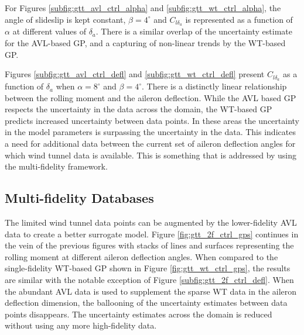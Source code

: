 For Figures \ref{subfig:gtt_avl_ctrl_alpha} and \ref{subfig:gtt_wt_ctrl_alpha}, the angle of slideslip is kept constant, $\beta=4^\circ$ and $C_{l{\delta_a}}$ is represented as a function of $\alpha$ at different values of $\delta_a$.
There is a similar overlap of the uncertainty estimate for the AVL-based GP, and a capturing of non-linear trends by the WT-based GP. 

Figures \ref{subfig:gtt_avl_ctrl_defl} and \ref{subfig:gtt_wt_ctrl_defl} present $C_{l{\delta_a}}$ as a function of $\delta_a$ when $\alpha = 8^\circ$ and $\beta = 4^\circ$.
There is a distinctly linear relationship between the rolling moment and the aileron deflection. 
While the AVL based GP respects the uncertainty in the data across the domain, the WT-based GP predicts increased uncertainty between data points. 
In these areas the uncertainty in the model parameters is surpassing the uncertainty in the data.
This indicates a need for additional data between the current set of aileron deflection angles for which wind tunnel data is available.
This is something that is addressed by using the multi-fidelity framework.

\subsection{Multi-fidelity Databases}
The limited wind tunnel data points can be augmented by the lower-fidelity AVL data to create a better surrogate model.
Figure \ref{fig:gtt_2f_ctrl_gps} continues in the vein of the previous figures with stacks of lines and surfaces representing the rolling moment at different aileron deflection angles. 
When compared to the single-fidelity WT-based GP shown in Figure \ref{fig:gtt_wt_ctrl_gps}, the results are similar with the notable exception of Figure \ref{subfig:gtt_2f_ctrl_defl}.
When the abundant AVL data is used to supplement the sparse WT data in the aileron deflection dimension, the ballooning of the uncertainty estimates between data points disappears. 
The uncertainty estimates across the domain is reduced without using any more high-fidelity data. 

